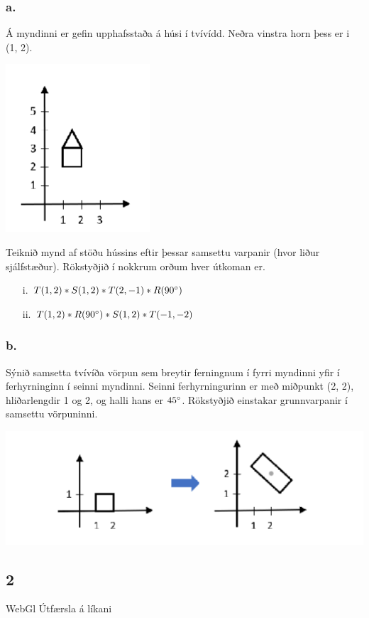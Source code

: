 \documentclass{article}
\begin{document}
\subsubsection{a.} Á myndinni er gefin upphafsstaða á húsi í tvívídd. Neðra vinstra horn þess er i (1, 2).

\includegraphics[scale = 0.9]{mynd2023a.png}

Teiknið mynd af stöðu hússins eftir þessar samsettu varpanir (hvor liður sjálfstæður). Rökstyðjið í nokkrum orðum hver útkoman er.

\begin{itemize}
    \item[i.] $T(1, 2)*S(1, 2)*T(2,-1)*R(90\degree)$
    \item[ii.] $T(1, 2)*R(90\degree)*S(1,2)*T(-1,-2)$
\end{itemize}

\subsubsection{b.} Sýnið samsetta tvívíða vörpun sem breytir ferningnum í fyrri myndinni yfir í
ferhyrninginn í seinni myndinni. Seinni ferhyrningurinn er með miðpunkt (2,
2), hliðarlengdir 1 og 2, og halli hans er $45\degree$. Rökstyðjið einstakar
grunnvarpanir í samsettu vörpuninni.

\includegraphics[scale = 0.9]{mynd2023b.png}

\newpage

\subsection{2} WebGl Útfærsla á líkani
\end{document}
